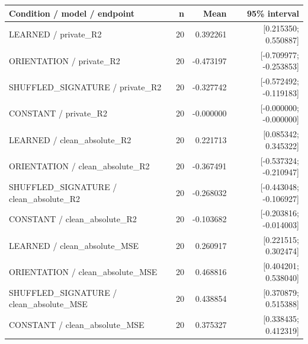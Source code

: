 \begin{longtable}{p{.56\linewidth}rrr}
\toprule Condition / model / endpoint & n & Mean & 95\% interval\\\midrule
LEARNED / private\_R2 & 20 & 0.392261 & [0.215350; 0.550887] \\
ORIENTATION / private\_R2 & 20 & -0.473197 & [-0.709977; -0.253853] \\
SHUFFLED\_SIGNATURE / private\_R2 & 20 & -0.327742 & [-0.572492; -0.119183] \\
CONSTANT / private\_R2 & 20 & -0.000000 & [-0.000000; -0.000000] \\
LEARNED / clean\_absolute\_R2 & 20 & 0.221713 & [0.085342; 0.345322] \\
ORIENTATION / clean\_absolute\_R2 & 20 & -0.367491 & [-0.537324; -0.210947] \\
SHUFFLED\_SIGNATURE / clean\_absolute\_R2 & 20 & -0.268032 & [-0.443048; -0.106927] \\
CONSTANT / clean\_absolute\_R2 & 20 & -0.103682 & [-0.203816; -0.014003] \\
LEARNED / clean\_absolute\_MSE & 20 & 0.260917 & [0.221515; 0.302474] \\
ORIENTATION / clean\_absolute\_MSE & 20 & 0.468816 & [0.404201; 0.538040] \\
SHUFFLED\_SIGNATURE / clean\_absolute\_MSE & 20 & 0.438854 & [0.370879; 0.515388] \\
CONSTANT / clean\_absolute\_MSE & 20 & 0.375327 & [0.338435; 0.412319] \\
\bottomrule\end{longtable}
